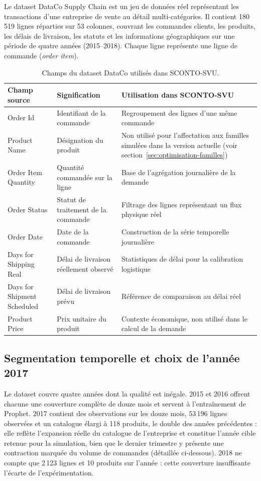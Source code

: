 \documentclass[11pt,a4paper]{article}
\begin{document}
Le dataset DataCo Supply Chain \cite{dataco2019} est un jeu de données réel représentant les transactions d'une entreprise de vente au détail multi-catégories. Il contient 180\,519 lignes réparties sur 53 colonnes, couvrant les commandes clients, les produits, les délais de livraison, les statuts et les informations géographiques sur une période de quatre années (2015--2018). Chaque ligne représente une ligne de commande (\emph{order item}).

\begin{table}[htbp]
\centering
\caption{Champs du dataset DataCo utilisés dans SCONTO-SVU.}
\label{tab:dataco-champs}
\begin{tabularx}{\textwidth}{>{\ttfamily}l X X}
\toprule
Champ source & Signification & Utilisation dans SCONTO-SVU \\
\midrule
Order Id & Identifiant de la commande & Regroupement des lignes d'une même commande \\
Product Name & Désignation du produit & Non utilisé pour l'affectation aux familles simulées dans la version actuelle (voir section~\ref{sec:optimisation-familles}) \\
Order Item Quantity & Quantité commandée sur la ligne & Base de l'agrégation journalière de la demande \\
Order Status & Statut de traitement de la commande & Filtrage des lignes représentant un flux physique réel \\
Order Date & Date de la commande & Construction de la série temporelle journalière \\
Days for Shipping Real & Délai de livraison réellement observé & Statistiques de délai pour la calibration logistique \\
Days for Shipment Scheduled & Délai de livraison prévu & Référence de comparaison au délai réel \\
Product Price & Prix unitaire du produit & Contexte économique, non utilisé dans le calcul de la demande \\
\bottomrule
\end{tabularx}
\end{table}

\subsection{Segmentation temporelle et choix de l'année 2017}

Le dataset couvre quatre années dont la qualité est inégale. 2015 et 2016 offrent chacune une couverture complète de douze mois et servent à l'entraînement de Prophet. 2017 contient des observations sur les douze mois, 53\,196 lignes observées et un catalogue élargi à 118 produits, le double des années précédentes : elle reflète l'expansion réelle du catalogue de l'entreprise et constitue l'année cible retenue pour la simulation, bien que le dernier trimestre y présente une contraction marquée du volume de commandes (détaillée ci-dessous). 2018 ne compte que 2\,123 lignes et 10 produits sur l'année : cette couverture insuffisante l'écarte de l'expérimentation.
\end{document}

